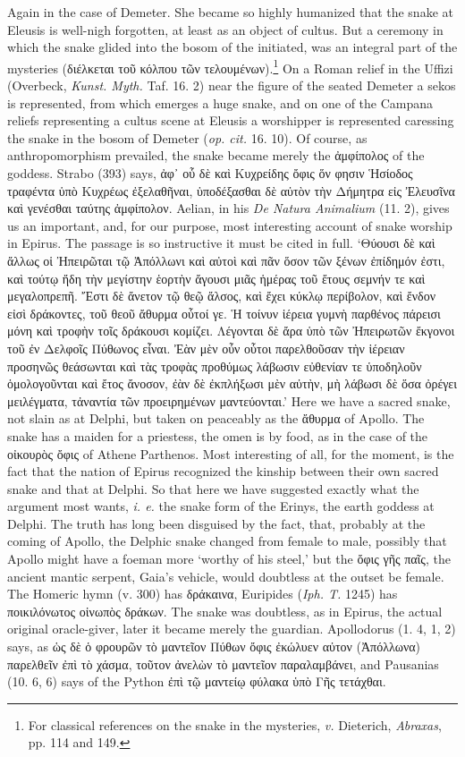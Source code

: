 \documentclass[a4paper, 11pt, oneside, polutonikogreek, english]{article}
\begin{document}
Again in the case of Demeter. She became so highly humanized that the snake at Eleusis is well-nigh forgotten, at least as an object of cultus. But a ceremony in which the snake glided into the bosom of the initiated, was an integral part of the mysteries (διέλκεται τοῦ κόλπου τῶν τελουμένων).\footnote{For classical references on the snake in the mysteries, \emph{v.} Dieterich, \emph{Abraxas}, pp. 114 and 149.} On a Roman relief in the Uffizi (Overbeck, \emph{Kunst. Myth.} Taf. 16. 2) near the figure of the seated Demeter a sekos is represented, from which emerges a huge snake, and on one of the Campana reliefs representing a cultus scene at Eleusis a worshipper is represented caressing the snake in the bosom of Demeter (\emph{op. cit.} 16. 10). Of course, as anthropomorphism prevailed, the snake became merely the ἀμφίπολος of the goddess. Strabo (393) says, ἀφ᾽ οὗ δὲ καὶ Κυχρείδης ὄφις ὅν φησιν Ἡσίοδος τραφέντα ὑπὸ Κυχρέως ἐξελαθῆναι, ὑποδέξασθαι δὲ αὐτὸν τὴν Δήμητρα εἰς Ἐλευσῖνα καὶ γενέσθαι ταύτης ἀμφίπολον. Aelian, in his \emph{De Natura Animalium} (11. 2), gives us an important, and, for our purpose, most interesting account of snake worship in Epirus. The passage is so instructive it must be cited in full. `Θύουσι δὲ καὶ ἄλλως οἱ Ἠπειρῶται τῷ Ἀπόλλωνι καὶ αὐτοὶ καὶ πᾶν ὅσον τῶν ξένων ἐπίδημόν ἐστι, καὶ τούτῳ ἤδη τὴν μεγίστην ἑορτὴν ἄγουσι μιᾶς ἡμέρας τοῦ ἔτους σεμνήν τε καὶ μεγαλοπρεπῆ. Ἔστι δὲ ἄνετον τῷ θεῷ ἄλσος, καὶ ἔχει κύκλῳ περίβολον, καὶ ἔνδον εἰσὶ δράκοντες, τοῦ θεοῦ ἄθυρμα οὗτοί γε. Ἡ τοίνυν ἱέρεια γυμνὴ παρθένος πάρεισι μόνη καὶ τροφὴν τοῖς δράκουσι κομίζει. Λέγονται δὲ ἄρα ὑπὸ τῶν Ἠπειρωτῶν ἔκγονοι τοῦ ἐν Δελφοῖς Πύθωνος εἶναι. Ἐὰν μὲν οὖν οὗτοι παρελθοῦσαν τὴν ἱέρειαν προσηνῶς θεάσωνται καὶ τὰς τροφὰς προθύμως λάβωσιν εὐθενίαν τε ὑποδηλοῦν ὁμολογοῦνται καὶ ἔτος ἄνοσον, ἐὰν δὲ ἐκπλήξωσι μὲν αὐτὴν, μὴ λάβωσι δὲ ὅσα ὀρέγει μειλέγματα, τἀναντία τῶν προειρημένων μαντεύονται.' Here we have a sacred snake, not slain as at Delphi, but taken on peaceably as the ἄθυρμα of Apollo. The snake has a maiden for a priestess, the omen is by food, as in the case of the οἰκουρὸς ὄφις of Athene Parthenos. Most interesting of all, for the moment, is the fact that the nation of Epirus recognized the kinship between their own sacred snake and that at Delphi. So that here we have suggested exactly what the argument most wants, \emph{i. e.} the snake form of the Erinys, the earth goddess at Delphi. The truth has long been disguised by the fact, that, probably at the coming of Apollo, the Delphic snake changed from female to male, possibly that Apollo might have a foeman more `worthy of his steel,' but the ὄφις γῆς παῖς, the ancient mantic serpent, Gaia's vehicle, would doubtless at the outset be female. The Homeric hymn (v. 300) has δράκαινα, Euripides (\emph{Iph. T.} 1245) has ποικιλόνωτος οἰνωπὸς δράκων. The snake was doubtless, as in Epirus, the actual original oracle-giver, later it became merely the guardian. Apollodorus (1. 4, 1, 2) says, as ὡς δὲ ὁ φρουρῶν τὸ μαντεῖον Πύθων ὄφις ἐκώλυεν αὐτον (Ἀπόλλωνα) παρελθεῖν ἐπὶ τὸ χάσμα, τοῦτον ἀνελὼν τὸ μαντεῖον παραλαμβάνει, and Pausanias (10. 6, 6) says of the Python ἐπὶ τῷ μαντείῳ φύλακα ὑπὸ Γῆς τετάχθαι.
\end{document}
